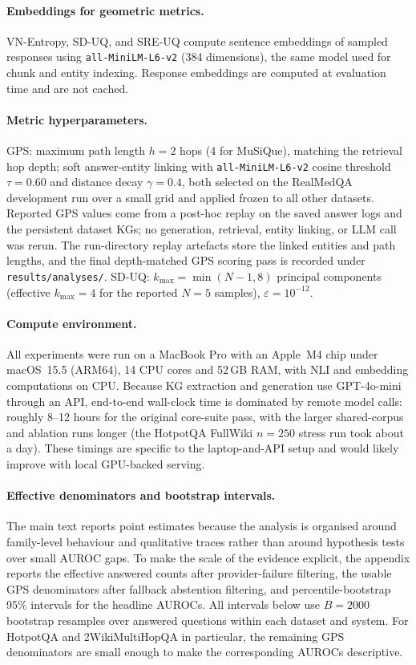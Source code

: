 \paragraph{Embeddings for geometric metrics.}
VN-Entropy, SD-UQ, and SRE-UQ compute sentence embeddings of sampled
responses using \texttt{all-MiniLM-L6-v2} (384 dimensions), the same
model used for chunk and entity indexing.
Response embeddings are computed at evaluation time and are not cached.

\paragraph{Metric hyperparameters.}
GPS: maximum path length $h = 2$ hops (4 for MuSiQue), matching the
retrieval hop depth; soft answer-entity linking with
\texttt{all-MiniLM-L6-v2} cosine threshold $\tau = 0.60$ and distance decay
$\gamma = 0.4$, both selected on the RealMedQA development run over a small
grid and applied frozen to all other datasets.
Reported GPS values come from a post-hoc replay on the saved answer logs
and the persistent dataset KGs; no generation, retrieval, entity linking, or
LLM call was rerun. The run-directory replay artefacts store the linked
entities and path lengths, and the final depth-matched GPS scoring pass is
recorded under \texttt{results/analyses/}.
SD-UQ: $k_{\max} = \min(N{-}1, 8)$ principal components
(effective $k_{\max}=4$ for the reported $N=5$ samples),
$\varepsilon = 10^{-12}$.

\paragraph{Compute environment.}
All experiments were run on a MacBook Pro with an Apple~M4 chip under
macOS~15.5 (ARM64), 14 CPU cores and 52\,GB RAM, with NLI and embedding
computations on CPU.
Because KG extraction and generation use GPT-4o-mini through an API,
end-to-end wall-clock time is dominated by remote model calls: roughly
8--12 hours for the original core-suite pass, with the larger shared-corpus
and ablation runs longer (the HotpotQA FullWiki $n=250$ stress run took about
a day).
These timings are specific to the laptop-and-API setup and would likely
improve with local GPU-backed serving.

\paragraph{Effective denominators and bootstrap intervals.}
The main text reports point estimates because the analysis is organised around
family-level behaviour and qualitative traces rather than around hypothesis
tests over small AUROC gaps.
To make the scale of the evidence explicit, the appendix reports the effective
answered counts after provider-failure filtering, the usable GPS
denominators after fallback abstention filtering, and percentile-bootstrap
95\% intervals for the headline AUROCs.
All intervals below use $B=2000$ bootstrap resamples over answered questions
within each dataset and system.
For HotpotQA and 2WikiMultiHopQA in particular, the remaining GPS
denominators are small enough to make the corresponding AUROCs descriptive.

